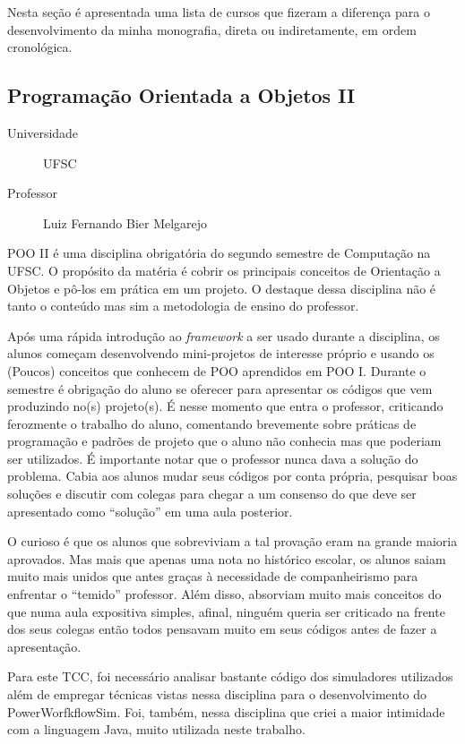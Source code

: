 Nesta seção é apresentada uma lista de cursos que fizeram a diferença para o
desenvolvimento da minha monografia, direta ou indiretamente, em ordem
cronológica.

\subsection{Programação Orientada a Objetos II}
\begin{description}
	\item[Universidade] UFSC
	\item[Professor] Luiz Fernando Bier Melgarejo
\end{description}
POO II é uma disciplina obrigatória do segundo semestre de Computação na UFSC.
O propósito da matéria é cobrir os principais conceitos de Orientação a Objetos
e pô-los em prática em um projeto. O destaque dessa disciplina não é tanto o
conteúdo mas sim a metodologia de ensino do professor.

Após uma rápida introdução ao \emph{framework} a ser usado durante a disciplina, os
alunos começam desenvolvendo mini-projetos de interesse próprio e usando os
(Poucos) conceitos que conhecem de POO aprendidos em POO I. Durante o semestre é
obrigação do aluno se oferecer para apresentar os códigos que vem produzindo 
no(s) projeto(s). É nesse momento que entra o professor, criticando ferozmente o
trabalho do aluno, comentando brevemente sobre práticas de programação e padrões
de projeto que o aluno não conhecia mas que poderiam ser utilizados. É
importante notar que o professor nunca dava a solução do problema. Cabia aos
alunos mudar seus códigos por conta própria, pesquisar boas soluções e 
discutir com colegas para chegar a um consenso do que deve ser apresentado como
``solução'' em uma aula posterior.

O curioso é que os alunos que sobreviviam a tal provação eram na grande maioria
aprovados. Mas mais que apenas uma nota no histórico escolar, os alunos saiam
muito mais unidos que antes graças à necessidade de companheirismo para
enfrentar o ``temido'' professor. Além disso, absorviam muito mais conceitos
do que numa aula expositiva simples, afinal, ninguém queria ser criticado na 
frente dos seus colegas então todos pensavam muito em seus códigos antes de 
fazer a apresentação.

Para este TCC, foi necessário analisar bastante código dos simuladores
utilizados além de empregar técnicas vistas nessa disciplina para o
desenvolvimento do PowerWorfkflowSim. Foi, também, nessa disciplina que criei
a maior intimidade com a linguagem Java, muito utilizada neste trabalho.

